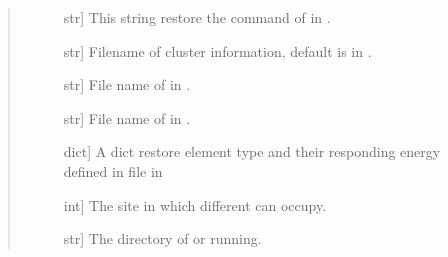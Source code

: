 \documentclass[letterpaper,10pt,english]{sphinxmanual}
\begin{document}
\begin{fulllineitems}
\begin{quote}
\begin{description}
\begin{description}
\item[{}] \leavevmode{[}str{]}
\sphinxAtStartPar
This string restore the command of  in .

\item[{}] \leavevmode{[}str{]}
\sphinxAtStartPar
Filename of cluster information, default is 
in .

\item[{}] \leavevmode{[}str{]}
\sphinxAtStartPar
File name of  in .

\item[{}] \leavevmode{[}str{]}
\sphinxAtStartPar
File name of  in .

\item[{}] \leavevmode{[}dict{]}
\sphinxAtStartPar
A dict restore element type and their responding energy defined in
 file in 

\item[{}] \leavevmode{[}int{]}
\sphinxAtStartPar
The site in which different can occupy.

\item[{}] \leavevmode{[}str{]}
\sphinxAtStartPar
The directory of  or  running.

\end{description}

\end{description}\end{quote}

\begin{fulllineitems}
\label{\detokenize{pygace:pygace.ce.CE.COMPARE_CRYSTAL}}
\end{fulllineitems}



\end{fulllineitems}
\end{document}

